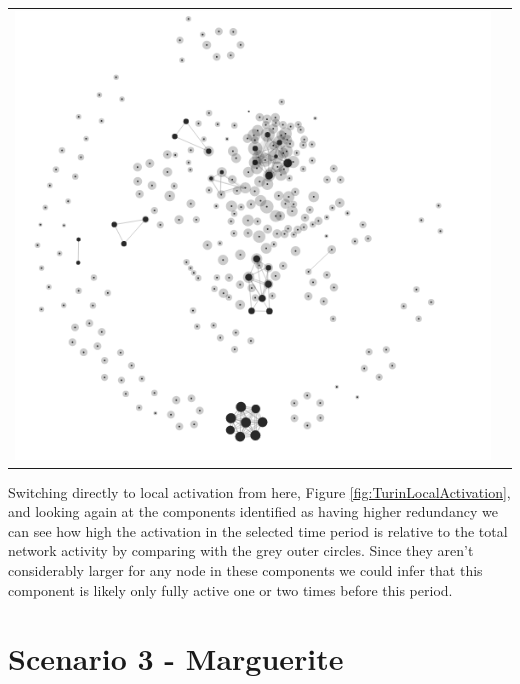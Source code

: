 \begin{center}
\begin{tabular}{cc}
\label{edgeTypes}
\includegraphics[trim={0 0 0 0}, width=140mm]{./Figures/TurinLocalActivation.png}
\end{tabular}
\label{fig:TurinLocalActivation}
\end{center}
Switching directly to local activation from here, Figure \ref{fig:TurinLocalActivation}, and looking again at the components identified as having higher redundancy we can see how high the activation in the selected time period is relative to the total network activity by comparing with the grey outer circles. Since they aren't considerably larger for any node in these components we could infer that this component is likely only fully active one or two times before this period.

\section{Scenario 3 - Marguerite} 

